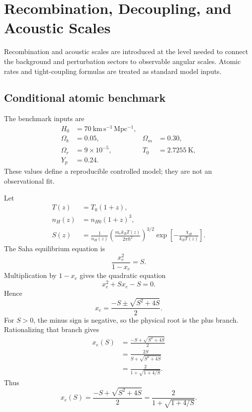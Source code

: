 \chapter{Recombination, Decoupling, and Acoustic Scales}

Recombination and acoustic scales are introduced at the level needed to connect the background and perturbation sectors to observable angular scales.  Atomic rates and tight-coupling formulas are treated as standard model inputs.

\allowdisplaybreaks

\section{Conditional atomic benchmark}
The benchmark inputs are
\begin{align}
H_0&=70\ \mathrm{km\,s^{-1}\,Mpc^{-1}},\\
\Omega_b&=0.05,
&\Omega_m&=0.30,\\
\Omega_r&=9\times10^{-5},
&T_0&=2.7255\ \mathrm K,\\
Y_p&=0.24.
\end{align}
These values define a reproducible controlled model; they are not an observational fit.

Let
\begin{align}
T(z)&=T_0(1+z),\\
n_H(z)&=n_{H0}(1+z)^3,\\
S(z)&=
\frac1{n_H(z)}
\left(
\frac{m_ek_BT(z)}{2\pi\hbar^2}
\right)^{3/2}
\exp\left[-\frac{\chi_H}{k_BT(z)}\right].
\end{align}
The Saha equilibrium equation is
\begin{equation}
\frac{x_e^2}{1-x_e}=S.
\end{equation}
Multiplication by \(1-x_e\) gives the quadratic equation
\begin{equation}
x_e^2+Sx_e-S=0.
\end{equation}
Hence
\begin{equation}
x_e=\frac{-S\pm\sqrt{S^2+4S}}{2}.
\end{equation}
For \(S>0\), the minus sign is negative, so the physical root is the plus branch.  Rationalizing that branch gives
\begin{align}
x_e(S)
&=\frac{-S+\sqrt{S^2+4S}}2\\
&=\frac{2S}{S+\sqrt{S^2+4S}}\\
&=\frac{2}{1+\sqrt{1+4/S}}.
\end{align}
Thus
\begin{equation}
\boxed{
x_e(S)=\frac{-S+\sqrt{S^2+4S}}2
=\frac{2}{1+\sqrt{1+4/S}}.
}
\end{equation}

